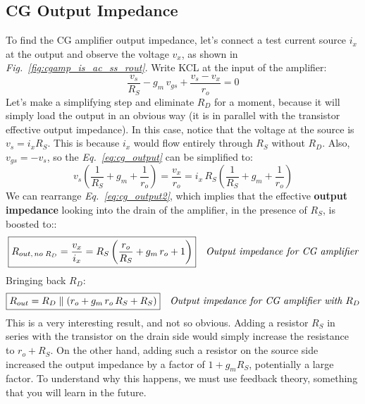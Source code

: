 \subsection{CG Output Impedance}
To find the CG amplifier output impedance, let's connect a test current source $i_x$ at the output and observe the voltage $v_x$, as shown in \emph{Fig.~\ref{fig:cgamp_is_ac_ss_rout}}.  Write KCL at the input of the amplifier:
    \begin{equation}
        \frac{v_s}{R_S} - g_m\,v_{gs} + \frac{v_s - v_x}{r_o} = 0
        \label{eq:cg_output}
    \end{equation}
Let's make a simplifying step and eliminate $R_D$ for a moment, because it will simply load the output in an obvious way (it is in parallel with the transistor effective output impedance).  In this case, notice that the voltage at the source is $v_s = i_x R_S$.  This is because $i_x$ would flow entirely through $R_S$ without $R_D$.  Also, $v_{gs} = -v_s$, so the \emph{Eq.~\ref{eq:cg_output}} can be simplified to:
    \begin{equation}
        v_s\left(\frac{1}{R_S} + g_m + \frac{1}{r_o}\right) = \frac{v_x}{r_o}
        = i_x\,R_S\left(\frac{1}{R_S} + g_m + \frac{1}{r_o}\right)
        \label{eq:cg_output2}
    \end{equation}
We can rearrange \emph{Eq.~\ref{eq:cg_output2}}, which implies that the effective \textbf{output impedance} looking into the drain of the amplifier, in the presence of $R_S$, is boosted to::
    \begin{align}
        \Aboxed{R_{out,\,no\;R_D} &= \frac{v_x}{i_x} = {R_S}\left(\frac{r_o}{R_S} + g_m\,r_o + 1\right)}
        &\textit{Output impedance for CG amplifier}
        \label{eq:cg_amplifier_input_impedance}
    \end{align}
Bringing back $R_D$:
    \begin{align}
        \Aboxed{R_{out} &= R_D \parallel \left(r_o + g_m\,r_o\,R_S + R_S\right)}
        &\textit{Output impedance for CG amplifier with $R_D$}
        \label{eq:cg_amplifier_input_impedance_rd}
    \end{align}
This is a very interesting result, and not so obvious.  Adding a resistor $R_S$ in series with the transistor on the drain side would simply increase the resistance to $r_o + R_S$.  On the other hand, adding such a resistor on the source side increased the output impedance by a factor of $1 + g_m R_S$, potentially a large factor.  To understand why this happens, we must use feedback theory, something that you will learn in the future.

